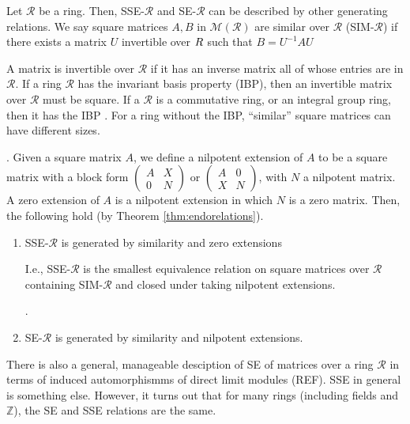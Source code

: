 \documentclass{amsart}
\theoremstyle{definition}
\theoremstyle{definition}
\newcommand{\Z}{\mathbb Z}
\numberwithin{equation}{subsection}
\begin{document}
Let $\mathcal R$ be a ring.
Then,  SSE-$\mathcal R$ and SE-$\mathcal R$
can be described by other generating relations.
We say square matrices
$A,B$ in $\mathcal M(\mathcal R)$ are similar over $\mathcal R$
(SIM-$\mathcal R$)
if there exists a
matrix $U$ invertible over
$\mathcal \mathcal R$
such that
$B=U^{-1}AU$\begin{footnote}{A matrix is invertible over
    $\mathcal R$ if it has an inverse matrix all of whose entries
    are in $\mathcal R$. If a ring $\mathcal R$ has the invariant basis
    property (IBP), then an invertible matrix over $\mathcal R$
    must be square. If a $\mathcal R$ is a commutative ring, or
    an integral group ring, then it has the
    IBP \cite{WeibelBook}.
    For a ring without the IBP, ``similar'' square matrices can have
different sizes. }\end{footnote}.
Given a square matrix $A$, we define a
 nilpotent extension of $A$ to be
a square matrix with a block form
$\left( \begin{smallmatrix} A&X\\0 & N \end{smallmatrix} \right)$
or
$\left( \begin{smallmatrix} A&0\\X & N \end{smallmatrix} \right)$,
with $N$ a nilpotent matrix. A zero extension of $A$ is a nilpotent
extension in which $N$ is a zero matrix.
Then, the following hold  (by Theorem \ref{thm:endorelations}).

\begin{enumerate}
\item
  SSE-$\mathcal R$  is generated by similarity and
 zero extensions\begin{footnote}{I.e.,  SSE-$\mathcal R$ is the smallest
   equivalence relation on square matrices over $\mathcal R$
   containing SIM-$\mathcal R$
and closed under taking nilpotent extensions.}\end{footnote}.

\item
  SE-$\mathcal R$  is generated by similarity and
nilpotent extensions.
\end{enumerate}




\iffalse

There is also a general, manageable desciption of SE of matrices over a
ring $\mathcal R$ in terms of induced automorphismms of direct
limit modules (REF).
 SSE in general is something else.
However, it turns out that for many rings (including
fields and $\Z$), the SE and SSE relations are the same.
\end{document}
